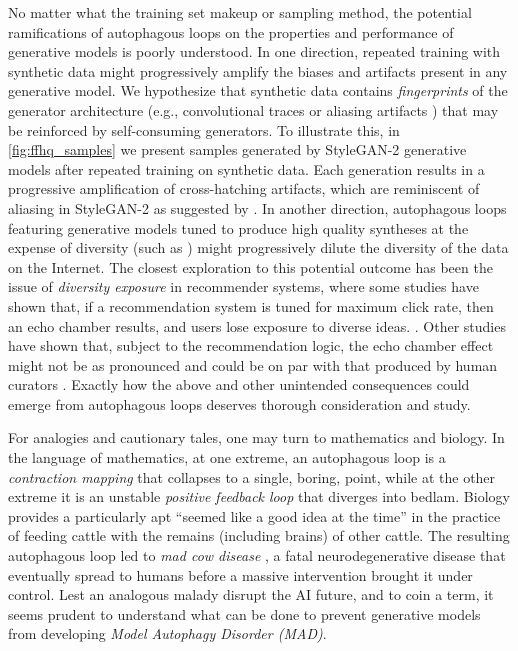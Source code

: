 \documentclass{article}
\begin{document}
No matter what the training set makeup or sampling method, the potential ramifications of autophagous loops on the properties and performance of generative models is poorly understood.
In one direction, repeated training with synthetic data might progressively amplify the biases and artifacts present in any generative model.
We hypothesize that synthetic data contains \textit{fingerprints} of the generator architecture (e.g., convolutional traces \cite{guarnera2020deepfake} or aliasing artifacts \cite{stylegan3karras2021}) that  may be reinforced by self-consuming generators. To illustrate this, in \cref{fig:ffhq_samples} we present samples generated by StyleGAN-2 generative models after repeated training on synthetic data. 
Each generation results in a progressive amplification of cross-hatching artifacts, which are reminiscent of aliasing in StyleGAN-2 as suggested by \cite{stylegan3karras2021}. 
%
In another direction, autophagous loops featuring generative models tuned to produce high quality syntheses at the expense of diversity (such as \cite{stylegan, classifier_free_guidance}) might progressively dilute the diversity of the data on the Internet.
The closest exploration to this potential outcome has been the issue of {\em diversity exposure} in recommender systems,
where some studies have shown that, if a recommendation system is tuned for maximum click rate, then an echo chamber results, and users lose exposure to diverse ideas.
\cite{stroud2011niche,dylko2017dark,beam2014automating,bakshy2015exposure,o2015down}. 
Other studies have shown that, subject to the recommendation logic, the echo chamber effect might not be as pronounced \cite{brown2022echo} and could be on par with that produced by human curators \cite{moller2018not}. 
Exactly how the above and other unintended consequences could emerge from autophagous loops deserves thorough consideration and study.


For analogies and cautionary tales, one may turn to mathematics and biology.
In the language of mathematics, at one extreme, an autophagous loop is a {\em contraction mapping} that collapses to a single, boring, point, while at the other extreme it is an unstable {\em positive feedback loop} that diverges into bedlam.
%
Biology provides a particularly apt ``seemed like a good idea at the time'' in the practice of feeding cattle with the remains (including brains) of other cattle.
The resulting autophagous loop led to {\em mad cow disease} \cite{10.1093/oxfordjournals.aje.a009064}, a fatal neurodegenerative disease that eventually spread to humans before a massive intervention brought it under control. Lest an analogous malady disrupt the AI future, and to coin a term, it seems prudent to understand what can be done to prevent generative models from developing {\em Model Autophagy Disorder (MAD)}.
\end{document}
